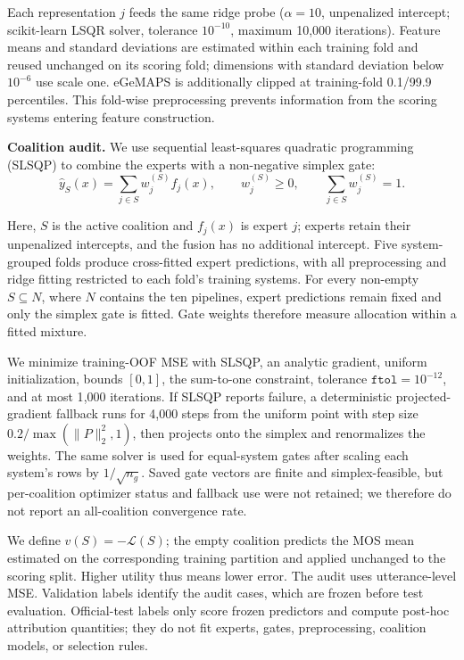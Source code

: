 \documentclass{article}
\begin{document}
Each representation $j$ feeds the same ridge probe ($\alpha=10$, unpenalized intercept; scikit-learn LSQR solver, tolerance $10^{-10}$, maximum 10{,}000 iterations). Feature means and standard deviations are estimated within each training fold and reused unchanged on its scoring fold; dimensions with standard deviation below $10^{-6}$ use scale one. eGeMAPS is additionally clipped at training-fold 0.1/99.9 percentiles. This fold-wise preprocessing prevents information from the scoring systems entering feature construction.


\noindent\textbf{Coalition audit.}
We use sequential least-squares quadratic programming (SLSQP) to combine the
experts with a non-negative simplex gate:
\begin{equation}
\hat y_S(x)
=
\sum_{j\in S} w_j^{(S)} f_j(x),
\qquad
w_j^{(S)}\geq 0,
\qquad
\sum_{j\in S} w_j^{(S)}=1 .
\label{eq:simplex}
\end{equation}

Here, $S$ is the active coalition and $f_j(x)$ is expert $j$; experts retain
their unpenalized intercepts, and the fusion has no additional intercept.
Five system-grouped folds produce cross-fitted expert predictions, with all
preprocessing and ridge fitting restricted to each fold's training systems.
For every non-empty $S\subseteq N$, where $N$ contains the ten pipelines,
expert predictions remain fixed and only the simplex gate is fitted. Gate
weights therefore measure allocation within a fitted mixture.

We minimize training-OOF MSE with SLSQP, an analytic gradient, uniform
initialization, bounds $[0,1]$, the sum-to-one constraint, tolerance
$\texttt{ftol}=10^{-12}$, and at most 1{,}000 iterations. If SLSQP reports
failure, a deterministic projected-gradient fallback runs for 4{,}000 steps
from the uniform point with step size $0.2/\max(\|P\|_2^2,1)$, then projects
onto the simplex and renormalizes the weights. The same
solver is used for equal-system gates after scaling each system's rows by
$1/\sqrt{n_g}$. Saved gate vectors are finite and simplex-feasible, but
per-coalition optimizer status and fallback use were not retained; we therefore
do not report an all-coalition convergence rate.

We define $v(S)=-\mathcal{L}(S)$; the empty coalition predicts the MOS mean
estimated on the corresponding training partition and applied unchanged to the
scoring split. Higher utility thus means lower error. The audit uses
utterance-level MSE. Validation labels identify the audit cases, which are
frozen before test evaluation. Official-test labels only score frozen
predictors and compute post-hoc attribution quantities; they do not fit
experts, gates, preprocessing, coalition models, or selection rules.
\end{document}
